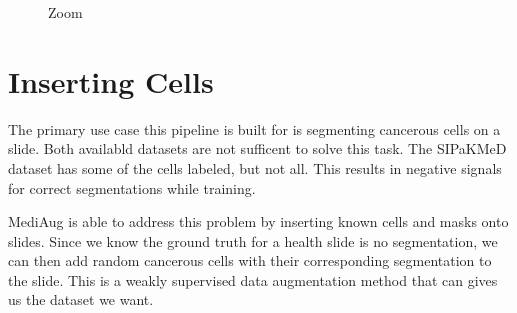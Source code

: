 \documentclass[ms,electronic,oneside,twosidetoc,letterpaper,chaptercenter,parttop]{byumsphd}
\begin{document}
\begin{figure}[H]
  \centering
   \quad
   \quad
   \quad
   \quad
  \caption{Zoom}
\end{figure}

\section{Inserting Cells}

The primary use case this pipeline is built for is segmenting cancerous cells on a slide.
Both availabld datasets are not sufficent to solve this task. The SIPaKMeD dataset has some
of the cells labeled, but not all. This results in negative signals for correct segmentations
while training.

MediAug is able to address this problem by inserting known cells and masks onto slides.
Since we know the ground truth for a health slide is no segmentation, we can then add 
random cancerous cells with their corresponding segmentation to the slide. This is a weakly 
supervised data augmentation method that can gives us the dataset we want.
\end{document}
